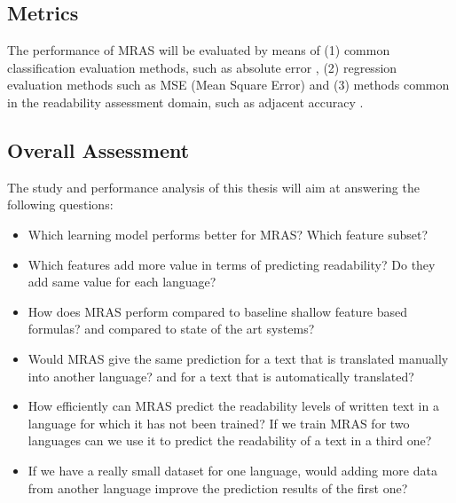 \documentclass{bsu-ms}
\begin{document}

\subsection{Metrics}
The performance of MRAS will be evaluated by means of (1) common classification evaluation methods, such as absolute error \cite{croft2010search}, (2) regression evaluation methods such as MSE (Mean Square Error) \cite{croft2010search} and (3) methods common in the readability assessment domain, such as adjacent accuracy \cite{franccois2012ai}. 

\subsection{Overall Assessment}
The study and performance analysis of this thesis will aim at answering the following questions:
\begin{itemize}

\item Which learning model performs better for MRAS? Which feature subset?
\item Which features add more value in terms of predicting readability? Do they add same value for each language?
\item How does MRAS perform compared to baseline shallow feature based formulas? and compared to state of the art systems?
\item Would MRAS give the same prediction for a text that is translated manually into another language? and for a text that is automatically translated?
\item How efficiently can MRAS predict the readability levels of written text in a language for which it has not been trained? If we train MRAS for two languages can we use it to predict the readability of a text in a third one?
\item If we have a really small dataset for one language, would adding more data from another language improve the prediction results of the first one?

\end{itemize}
\end{document}
